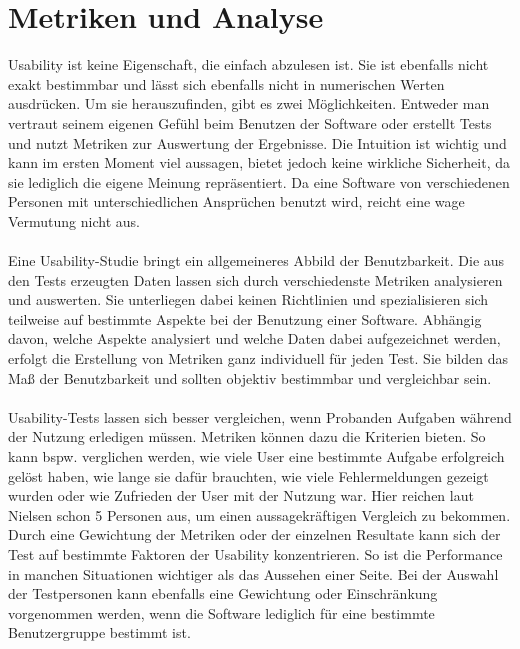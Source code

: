 %
%
%
%


\section{Metriken und Analyse}
\label{metrics}

Usability ist keine Eigenschaft, die einfach abzulesen ist. Sie ist ebenfalls nicht exakt bestimmbar und lässt sich ebenfalls nicht in numerischen Werten ausdrücken. Um sie herauszufinden, gibt es zwei Möglichkeiten. Entweder man vertraut seinem eigenen Gefühl beim Benutzen der Software oder erstellt Tests und nutzt Metriken zur Auswertung der Ergebnisse. Die Intuition ist wichtig und kann im ersten Moment viel aussagen, bietet jedoch keine wirkliche Sicherheit, da sie lediglich die eigene Meinung repräsentiert. Da eine Software von verschiedenen Personen mit unterschiedlichen Ansprüchen benutzt wird, reicht eine wage Vermutung nicht aus.\\
\\
Eine Usability-Studie bringt ein allgemeineres Abbild der Benutzbarkeit. Die aus den Tests erzeugten Daten lassen sich durch verschiedenste Metriken analysieren und auswerten. Sie unterliegen dabei keinen Richtlinien und spezialisieren sich teilweise auf bestimmte Aspekte bei der Benutzung einer Software. Abhängig davon, welche Aspekte analysiert und welche Daten dabei aufgezeichnet werden, erfolgt die Erstellung von Metriken ganz individuell für jeden Test. Sie bilden das Maß der Benutzbarkeit und sollten objektiv bestimmbar und vergleichbar sein.\\
\\
Usability-Tests lassen sich besser vergleichen, wenn Probanden Aufgaben während der Nutzung erledigen müssen. Metriken können dazu die Kriterien bieten. So kann bspw. verglichen werden, wie viele User eine bestimmte Aufgabe erfolgreich gelöst haben, wie lange sie dafür brauchten, wie viele Fehlermeldungen gezeigt wurden oder wie Zufrieden der User mit der Nutzung war. Hier reichen laut Nielsen \cite{metrics} schon 5 Personen aus, um einen aussagekräftigen Vergleich zu bekommen. Durch eine Gewichtung der Metriken oder der einzelnen Resultate kann sich der Test auf bestimmte Faktoren der Usability konzentrieren. So ist die Performance in manchen Situationen wichtiger als das Aussehen einer Seite. Bei der Auswahl der Testpersonen kann ebenfalls eine Gewichtung oder Einschränkung vorgenommen werden, wenn die Software lediglich für eine bestimmte Benutzergruppe bestimmt ist.\\
